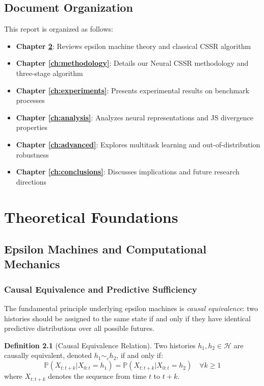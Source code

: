 \documentclass[11pt,a4paper]{report}
\newcommand{\epsmachine}{\varepsilon}
\newcommand{\histories}{\mathcal{H}}
\newcommand{\prob}{\mathbb{P}}
\theoremstyle{definition}
\newtheorem{definition}{Definition}[chapter]
\begin{document}
\section{Document Organization}
\label{sec:organization}

This report is organized as follows:

\begin{itemize}
    \item \textbf{Chapter \ref{ch:foundations}}: Reviews epsilon machine theory and classical CSSR algorithm
    \item \textbf{Chapter \ref{ch:methodology}}: Details our Neural CSSR methodology and three-stage algorithm
    \item \textbf{Chapter \ref{ch:experiments}}: Presents experimental results on benchmark processes
    \item \textbf{Chapter \ref{ch:analysis}}: Analyzes neural representations and JS divergence properties
    \item \textbf{Chapter \ref{ch:advanced}}: Explores multitask learning and out-of-distribution robustness
    \item \textbf{Chapter \ref{ch:conclusions}}: Discusses implications and future research directions
\end{itemize}

\chapter{Theoretical Foundations}
\label{ch:foundations}

\section{Epsilon Machines and Computational Mechanics}
\label{sec:epsilon-theory}

\subsection{Causal Equivalence and Predictive Sufficiency}

The fundamental principle underlying epsilon machines is \textit{causal equivalence}: two histories should be assigned to the same state if and only if they have identical predictive distributions over all possible futures.

\begin{definition}[Causal Equivalence Relation]
\label{def:causal-equiv}
Two histories $h_1, h_2 \in \histories$ are causally equivalent, denoted $h_1 \sim_{\epsmachine} h_2$, if and only if:
$$\prob(X_{t:t+k} | X_{0:t} = h_1) = \prob(X_{t:t+k} | X_{0:t} = h_2) \quad \forall k \geq 1$$
where $X_{t:t+k}$ denotes the sequence from time $t$ to $t+k$.
\end{definition}
\end{document}
